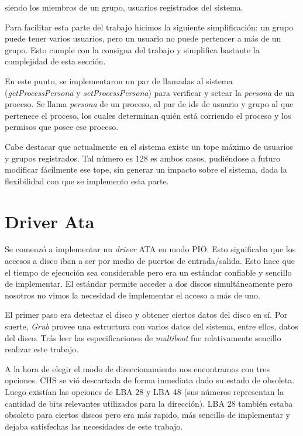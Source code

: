 \documentclass[a4paper,10pt]{article}
\begin{document}
siendo los miembros de un grupo, usuarios registrados del sistema.

Para facilitar esta parte del trabajo hicimos la siguiente simplificación: un grupo puede tener varios usuarios, pero un usuario no puede pertencer a más de 
un grupo. Esto cumple con la consigna del trabajo y simplifica bastante la complejidad de esta sección.

En este punto, se implementaron un par de llamadas al sistema (\textit{getProcessPersona} y \textit{setProcessPersona}) para verificar y setear la \textit{persona}
de un proceso. Se llama \textit{persona} de un proceso, al par de ids de usuario y grupo al que pertenece el proceso, los cuales determinan quién está corriendo
el proceso y los permisos que posee ese proceso.

Cabe destacar que actualmente en el sistema existe un tope máximo de usuarios y grupos registrados. Tal número es 128 es ambos casos, pudiéndose a futuro modificar
fácilmente ese tope, sin generar un impacto sobre el sistema, dada la flexibilidad con que se implemento esta parte.

\newpage
\section{Driver Ata}
    Se comenzó a implementar un \textit{driver} ATA en modo PIO. Esto significaba que los accesos a disco iban a ser
    por medio de puertos de entrada/salida. Esto hace que el tiempo de ejecución sea considerable pero era un estándar
    confiable y sencillo de implementar.
    El estándar permite acceder a dos discos simultáneamente pero nosotros no vimos la necesidad de implementar el 
    acceso a más de uno.
    
    El primer paso era detectar el disco y obtener ciertos datos del disco en sí. Por suerte, \textit{Grub} provee una estructura
    con varios datos del sistema, entre ellos, datos del disco. Trás leer las especificaciones de \textit{multiboot}
    fue relativamente sencillo realizar este trabajo.

    A la hora de elegir el modo de direccionamiento nos encontramos con tres opciones. CHS se vió descartada de forma
    inmediata dado su estado de obsoleta. Luego existían las opciones de LBA 28 y LBA 48 (sus números representan
    la cantidad de bits relevantes utilizados para la dirección). LBA 28 también estaba obsoleto para ciertos discos
    pero era más rapido, más sencillo de implementar y dejaba satisfechas las necesidades de este trabajo.
\end{document}
